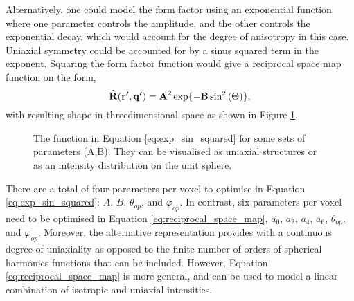 Alternatively, one could model the form factor using an exponential function where one parameter controls the amplitude, and the other controls the exponential decay,
which would account for the degree of anisotropy in this case. Uniaxial symmetry could be accounted for by a sinus squared term in the exponent.
Squaring the form factor function would give a reciprocal space map function on the form,
\begin{equation}\label{eq:exp_sin_squared}
    \vectorBU{\widehat{R}}(\vectorBU{r'}, \vectorBU{q'}) = \vectorBU{A}^{2} \exp\{-\vectorBU{B} \sin^{2}\left( \vectorgreek{\Theta} \right) \}, %
\end{equation}
with resulting shape in threedimensional space as shown in Figure \ref{fig:exp_sin_squared}.

\begin{figure}
    \centering
    \caption[Illustration of Alternative Functional]{The function in Equation \eqref{eq:exp_sin_squared} for some sets of parameters (A,B).
        They can be visualised as uniaxial structures or as an intensity distribution on the unit sphere.}
    \label{fig:exp_sin_squared}
\end{figure}

There are a total of four parameters per voxel to optimise in Equation \eqref{eq:exp_sin_squared}: $A$, $B$, $\theta_{op}$, and $\varphi_{op}$.
In contrast, six parameters per voxel need to be optimised in Equation \eqref{eq:reciprocal_space_map},
$a_{0}$, $a_{2}$, $a_{4}$, $a_{6}$, $\theta_{op}$, and $\varphi_{op}$.
Moreover, the alternative representation provides with a continuous degree of uniaxiality
as opposed to the finite number of orders of spherical harmonics functions that can be included.
However, Equation \eqref{eq:reciprocal_space_map} is more general, and can be used to model a linear combination of isotropic and uniaxial intensities.



